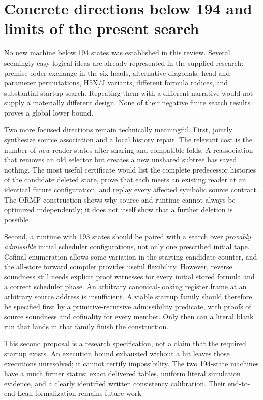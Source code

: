 \documentclass[11pt]{article}
\begin{document}
\section{Concrete directions below 194 and limits of the present search}

No new machine below 194 states was established in this review.  Several
seemingly easy logical ideas are already represented in the supplied
research: premise-order exchange in the six heads, alternative
diagonals, head and parameter permutations, H5X/J variants, different
formula radices, and substantial startup search.  Repeating them with
a different narrative would not supply a materially different design.
None of their negative finite search results proves a global lower
bound.

Two more focused directions remain technically meaningful.  First,
jointly synthesize source association and a local history repair.  The
relevant cost is the number of \emph{new} reader states after sharing
and compatible folds.  A reassociation that removes an old selector
but creates a new unshared subtree has saved nothing.  The most useful
certificate would list the complete predecessor histories of the
candidate deleted state, prove that each meets an existing reader at
an identical future configuration, and replay every affected symbolic
source contract.  The ORMP construction shows why source and runtime
cannot always be optimized independently; it does not itself show
that a further deletion is possible.

Second, a runtime with 193 states should be paired with a search over
\emph{provably admissible} initial scheduler configurations, not only
one prescribed initial tape.  Cofinal enumeration allows some variation
in the starting candidate counter, and the all-store forward compiler
provides useful flexibility.  However, reverse soundness still needs
explicit proof witnesses for every initial stored formula and a
correct scheduler phase.  An arbitrary canonical-looking register
frame at an arbitrary source address is insufficient.  A viable
startup family should therefore be specified first by a
primitive-recursive admissibility predicate, with proofs of source
soundness and cofinality for every member.  Only then can a literal
blank run that lands in that family finish the construction.

This second proposal is a research specification, not a claim that the
required startup exists.  An execution bound exhausted without a hit
leaves those executions unresolved; it cannot certify impossibility.
The two 194-state machines have a much firmer status: exact delivered
tables, uniform literal simulation evidence, and a clearly identified
written consistency calibration.  Their end-to-end Lean
formalization remains future work.
\end{document}
